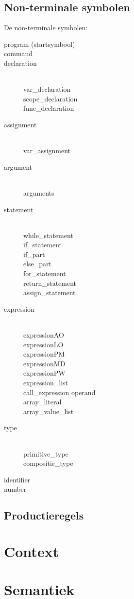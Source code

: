 \subsection{Non-terminale symbolen}
De non-terminale symbolen:
\begin{description}
    \item[program (startsymbool)] 
    \item[command]
    \item[declaration] \hfill \\
        var\_declaration \\
        scope\_declaration \\
        func\_declaration
    \item[assignment] \hfill \\
        var\_assignment
    \item[argument] \hfill \\
        arguments
    \item[statement] \hfill \\
        while\_statement \\
        if\_statement \\ 
        if\_part \\
        else\_part \\
        for\_statement \\
        return\_statement \\
        assign\_statement
    \item[expression] \hfill \\
        expressionAO \\
        expressionLO \\
        expressionPM \\
        expressionMD \\
        expressionPW \\
        expression\_list \\
        call\_expression
        operand \\
        array\_literal \\
        array\_value\_list
    \item[type] \hfill \\
        primitive\_type \\
        compositie\_type
    \item[identifier]
    \item[number]
\end{description}
\subsection{Productieregels}
\section{Context}

\section{Semantiek}

\clearpage